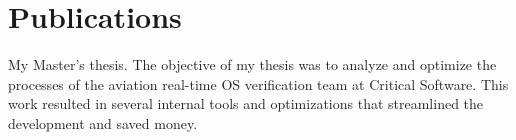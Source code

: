 \documentclass[letterpaper]{twentysecondcv} %
\begin{document}
\vfill


\section{Publications}

\begin{twenty}
    {}
    {My Master's thesis. The objective of my thesis was to analyze and optimize
    the processes of the aviation real-time OS verification team at Critical
    Software. This work resulted in several internal tools and optimizations
    that streamlined the development and saved money.}
\end{twenty}


\vfill
\end{document}
